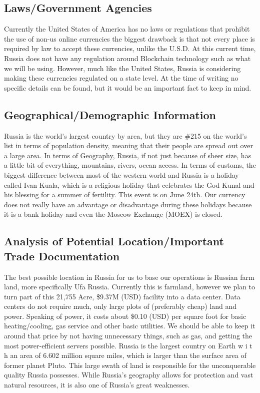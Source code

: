 \documentclass[12pt]{article}
\begin{document}
\subsection{Laws/Government Agencies}
Currently the United States of America has no laws or regulations that prohibit the use of
non-us online currencies the biggest drawback is that not every place is required by law to
accept these currencies, unlike the U.S.D. At this current time, Russia does not have any
regulation around Blockchain technology such as what we will be using. However, much
like the United States, Russia is considering making these currencies regulated on a state
level. At the time of writing no specific details can be found, but it would be an important
fact to keep in mind. 
\subsection{Geographical/Demographic Information}
Russia is the world's largest country by area, but they are \#215 on the world's list in terms
of population density, meaning that their people are spread out over a large area. In terms
of Geography, Russia, if not just because of sheer size, has a little bit of everything,
mountains, rivers, ocean access. In terms of customs, the biggest difference between most of the western world and Russia is a holiday called Ivan Kuala, which is a religious holiday
that celebrates the God Kunal and his blessing for a summer of fertility. This event is on
June 24th. Our currency does not really have an advantage or disadvantage during these
holidays because it is a bank holiday and even the Moscow Exchange (MOEX) is closed. 

\subsection{Analysis of Potential Location/Important Trade Documentation}
The best possible location in Russia for us to base our operations is Russian farm land,
more specifically Ufa Russia. Currently this is farmland, however we plan to turn part of
this 21,755 Acre, \$9.37M (USD) facility into a data center. Data centers do not require
much, only large plots of (preferably cheap) land and power. Speaking of power, it costs
about \$0.10 (USD) per square foot for basic heating/cooling, gas service and other basic
utilities. We should be able to keep it around that price by not having unnecessary things,
such as gas, and getting the most power-efficient servers possible. Russia is the largest
country on Earth w i t h an area of 6.602 million square miles, which is larger than the
surface area of former planet Pluto. This large swath of land is responsible for the
unconquerable quality Russia possesses. While Russia’s geography allows for
protection and vast natural resources, it is also one of Russia’s great weaknesses.
\pagebreak
\end{document}
